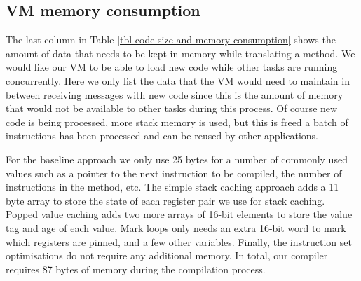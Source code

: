 \subsection{VM memory consumption} The last column in Table \ref{tbl-code-size-and-memory-consumption} shows the amount of data that needs to be kept in memory while translating a method. We would like our VM to be able to load new code while other tasks are running concurrently. Here we only list the data that the VM would need to maintain in between receiving messages with new code since this is the amount of memory that would not be available to other tasks during this process. Of course new code is being processed, more stack memory is used, but this is freed a batch of instructions has been processed and can be reused by other applications.

For the baseline approach we only use 25 bytes for a number of commonly used values such as a pointer to the next instruction to be compiled, the number of instructions in the method, etc. The simple stack caching approach adds a 11 byte array to store the state of each register pair we use for stack caching. Popped value caching adds two more arrays of 16-bit elements to store the value tag and age of each value. Mark loops only needs an extra 16-bit word to mark which registers are pinned, and a few other variables. Finally, the instruction set optimisations do not require any additional memory. In total, our compiler requires 87 bytes of memory during the compilation process.

